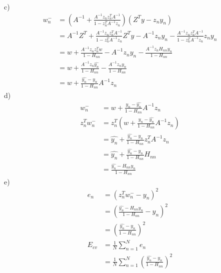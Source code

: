 \documentclass[12pt]{article}
\begin{document}
 \indent c) 
  \begin{align*} 
 \displaystyle
 w_n^-&= (A^{-1} + \frac{A^{-1}z_n z_n^T A^{-1}}{1 - z_n^TA^{-1}z_n})(Z^T y - z_n y_n)\\
 &= A^{-1}Z^T + \frac{A^{-1}z_n z_n^T A^{-1}}{1 - z_n^TA^{-1}z_n} Z^T y - A^{-1} z_n y_n - \frac{A^{-1}z_n z_n^T A^{-1}}{1 - z_n^TA^{-1}z_n} z_n y_n\\
 & = w + \frac{A^{-1}z_n z_n^T w}{1 - H_{nn}} - A^{-1} z_n y_n - \frac{A^{-1}z_n H_{nn} y_n}{1 - H_{nn}}\\
 & = w + \frac{A^{-1}z_n \hat{y_n}}{1 - H_{nn}} - \frac{A^{-1}z_n y_n}{1 - H_{nn}}\\
 & = w + \frac{\hat{y_n} - y_n}{1 - H_{nn}} A^{-1} z_n
 \end{align*}
\indent d)
 \begin{align*} 
 \displaystyle
 w_n^-&=w + \frac{y_n - \hat{y_n}}{1 - H_{nn}} A^{-1} z_n\\
 z_n^T w_n^- & = z_n^T(w + \frac{y_n - \hat{y_n}}{1 - H_{nn}} A^{-1} z_n)\\
 & = \hat{y_n} + \frac{\hat{y_n} - y_n}{1 - H_{nn}} z_n^T A^{-1} z_n\\
 & = \hat{y_n} + \frac{\hat{y_n} - y_n}{1 - H_{nn}} H_{nn}\\
 & = \frac{\hat{y_n} - H_{nn}y_n}{1 - H_{nn}}
 \end{align*}
 \indent e)
 \begin{align*} 
 \displaystyle
 e_n & = (z_n^T w_n^-  - y_n)^2\\
 & = (\frac{\hat{y_n} - H_{nn}y_n}{1 - H_{nn}} - y_n)^2\\
 & = (\frac{\hat{y_n} - y_n}{1 - H_{nn}})^2 \\
 E_{cv}&= \frac{1}{N}\sum_{n = 1}^{N}e_n\\
 & =  \frac{1}{N}\sum_{n = 1}^{N} (\frac{\hat{y_n} - y_n}{1 - H_{nn}})^2
 \end{align*}
\end{document}
